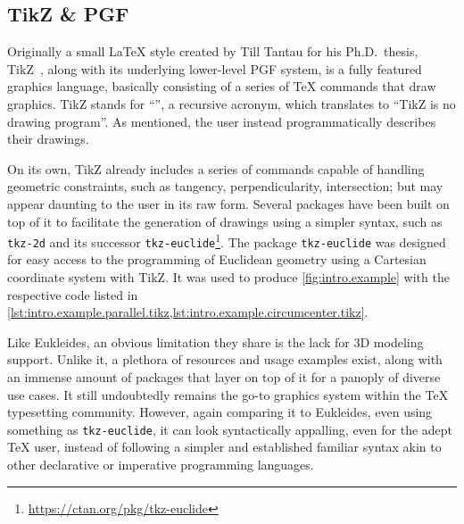 \subsection{TikZ \& PGF}%
\label{sec:related.constraints.tikz}

Originally a small \LaTeX{} style created by Till Tantau for his Ph.D.\ thesis,
\acs{TikZ}~\cite{Tantau:2021:TikZ}, along with its underlying lower-level
\ac{PGF} system, is a fully featured graphics language, basically consisting of
a series of \TeX{} commands that draw graphics.  \acs{TikZ} stands for
``\label{acro:TikZ}'', a recursive acronym, which translates to
``\ac{TikZ} is no drawing program''.  As mentioned, the user instead
programmatically describes their drawings.

On its own, \ac{TikZ} already includes a series of commands capable of handling
geometric constraints, such as tangency, perpendicularity, intersection; but may
appear daunting to the user in its raw form.  Several packages have been built
on top of it to facilitate the generation of drawings using a simpler syntax,
such as \texttt{tkz-2d} and its successor
\texttt{tkz-euclide}\footnote{\url{https://ctan.org/pkg/tkz-euclide}}.  The
package \texttt{tkz-euclide} was designed for easy access to the programming of
Euclidean geometry using a Cartesian coordinate system with \ac{TikZ}.  It was
used to produce \cref{fig:intro.example} with the respective code listed in
\cref{lst:intro.example.parallel.tikz,lst:intro.example.circumcenter.tikz}.

Like Eukleides, an obvious limitation they share is the lack for 3D modeling
support.  Unlike it, a plethora of resources and usage examples exist, along
with an immense amount of packages that layer on top of it for a panoply of
diverse use cases.  It still undoubtedly remains the go-to graphics system
within the \TeX{} typesetting community.  However, again comparing it to
Eukleides, even using something as \texttt{tkz-euclide}, it can look
syntactically appalling, even for the adept \TeX{} user, instead of following a
simpler and established familiar syntax akin to other declarative or imperative
programming languages.
